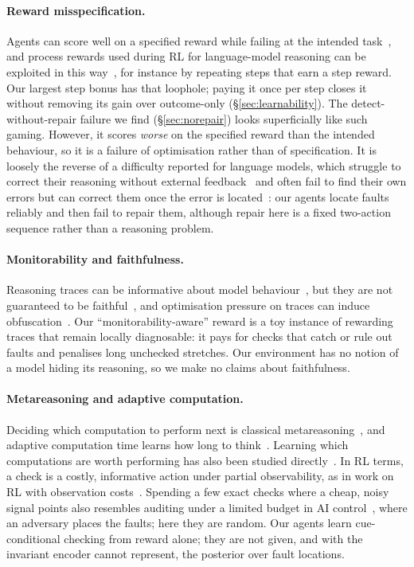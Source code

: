 \paragraph{Reward misspecification.}
Agents can score well on a specified reward while failing at the intended task~\citep{krakovna2020specification,skalse2022hacking,pan2022misspecification}, and process rewards used during RL for language-model reasoning can be exploited in this way~\citep{gao2024designing}, for instance by repeating steps that earn a step reward. Our largest step bonus has that loophole; paying it once per step closes it without removing its gain over outcome-only (\S\ref{sec:learnability}). The detect-without-repair failure we find (\S\ref{sec:norepair}) looks superficially like such gaming. However, it scores \emph{worse} on the specified reward than the intended behaviour, so it is a failure of optimisation rather than of specification. It is loosely the reverse of a difficulty reported for language models, which struggle to correct their reasoning without external feedback~\citep{huang2024selfcorrect} and often fail to find their own errors but can correct them once the error is located~\citep{tyen2024llms}: our agents locate faults reliably and then fail to repair them, although repair here is a fixed two-action sequence rather than a reasoning problem.

\paragraph{Monitorability and faithfulness.}
Reasoning traces can be informative about model behaviour~\citep{baker2025monitoring,korbak2025cot}, but they are not guaranteed to be faithful~\citep{turpin2023unfaithful,lanham2023faithfulness,chen2025reasoning}, and optimisation pressure on traces can induce obfuscation~\citep{baker2025monitoring}. Our ``monitorability-aware'' reward is a toy instance of rewarding traces that remain locally diagnosable: it pays for checks that catch or rule out faults and penalises long unchecked stretches. Our environment has no notion of a model hiding its reasoning, so we make no claims about faithfulness.

\paragraph{Metareasoning and adaptive computation.}
Deciding which computation to perform next is classical metareasoning~\citep{russell1991principles,hay2012selecting}, and adaptive computation time learns how long to think~\citep{graves2016adaptive}. Learning which computations are worth performing has also been studied directly~\citep{callaway2018learning}. In RL terms, a check is a costly, informative action under partial observability, as in work on RL with observation costs~\citep{bellinger2021active,nam2021reinforcement}. Spending a few exact checks where a cheap, noisy signal points also resembles auditing under a limited budget in AI control~\citep{greenblatt2024control}, where an adversary places the faults; here they are random. Our agents learn cue-conditional checking from reward alone; they are not given, and with the invariant encoder cannot represent, the posterior over fault locations.

